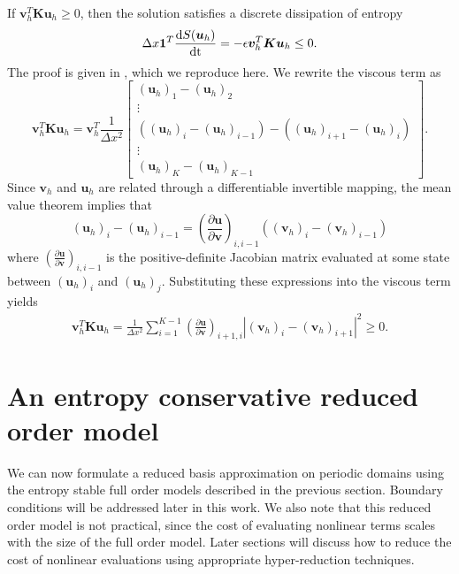 \documentclass[review]{siamart171218}
\theoremstyle{assumption}
\newcommand{\td}[2]{\frac{{\rm d}#1}{{\rm d}{\rm #2}}}
\newcommand{\pd}[2]{\frac{\partial#1}{\partial#2}}
\newcommand{\LRp}[1]{\left( #1 \right)}
\newcommand{\LRb}[1]{\left| #1 \right|}
\begin{document}
If $\bm{v}_h^T\bm{K}\bm{u}_h \geq 0$, then the solution satisfies a discrete dissipation of entropy
\begin{equation}
\Delta x \bm{1}^T\td{S(\bm{u}_h)}{t} = -\epsilon\bm{v}_h^T\bm{K}\bm{u}_h \leq 0.
\label{eq:entropybalancefom}
\end{equation}
The proof is given in \cite{tadmor2006entropy}, which we reproduce here.  We rewrite the viscous term as
\[
\bm{v}_h^T\bm{K}\bm{u}_h = \bm{v}_h^T \frac{1}{\Delta x^2}\begin{bmatrix}
\LRp{\bm{u}_h}_1 - \LRp{\bm{u}_h}_2\\ 
\vdots\\
\LRp{\LRp{\bm{u}_h}_i - \LRp{\bm{u}_h}_{i-1}} - \LRp{\LRp{\bm{u}_h}_{i+1} - \LRp{\bm{u}_h}_{i}}\\
\vdots\\
\LRp{\bm{u}_h}_K- \LRp{\bm{u}_h}_{K-1} 
\end{bmatrix}.
\]
Since $\bm{v}_h$ and $\bm{u}_h$ are related through a differentiable invertible mapping, the mean value theorem implies that
\[
\LRp{\bm{u}_h}_i - \LRp{\bm{u}_h}_{i-1} = \LRp{\pd{\bm{u}}{\bm{v}}}_{i,i-1} \LRp{\LRp{\bm{v}_h}_i - \LRp{\bm{v}_h}_{i-1}}
\]
where $\LRp{\pd{\bm{u}}{\bm{v}}}_{i,i-1}$ is the positive-definite Jacobian matrix evaluated at some state between $(\bm{u}_h)_i$ and $(\bm{u}_h)_j$.  Substituting these expressions into the viscous term yields 
\begin{gather}
\bm{v}_h^T\bm{K}\bm{u}_h = 
 \frac{1}{\Delta x^2}\sum_{i=1}^{K-1} \LRp{\pd{\bm{u}}{\bm{v}}}_{i+1,i} \LRb{\LRp{\bm{v}_h}_{i} - \LRp{\bm{v}_h}_{i+1}}^2 \geq 0.
 \label{eq:entropydissfom}
\end{gather}


\section{An entropy conservative reduced order model}
\label{sec:3}
We can now formulate a reduced basis approximation on periodic domains using the entropy stable full order models described in the previous section.  Boundary conditions will be addressed later in this work.  We also note that this reduced order model is not practical, since the cost of evaluating nonlinear terms scales with the size of the full order model.  Later sections will discuss how to reduce the cost of nonlinear evaluations using appropriate hyper-reduction techniques.
\end{document}
